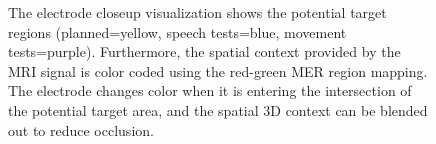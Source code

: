 \documentclass[journal]{vgtc}                %
\begin{document}
\begin{figure}[t]
  \centering
  \caption{The electrode closeup visualization shows the potential target regions (planned=yellow, speech tests=blue, movement tests=purple). Furthermore, the spatial context provided by the MRI signal is color coded using the red-green MER region mapping. The electrode changes color when it is entering the intersection of the potential target area, and the spatial 3D context can be blended out to reduce occlusion.}
  \label{fig:targetregion}
\end{figure}
\end{document}
